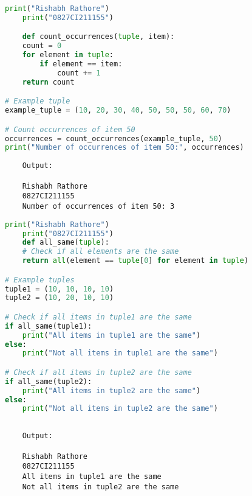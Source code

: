 \documentclass{report}
\begin{document}
\newpage

\sol 
\begin{lstlisting}[language=Python]
	print("Rishabh Rathore")
	print("0827CI211155")

	def count_occurrences(tuple, item):
    count = 0
    for element in tuple:
        if element == item:
            count += 1
    return count

# Example tuple
example_tuple = (10, 20, 30, 40, 50, 50, 50, 60, 70)

# Count occurrences of item 50
occurrences = count_occurrences(example_tuple, 50)
print("Number of occurrences of item 50:", occurrences)


\end{lstlisting}

\begin{verbatim}
	Output:

	Rishabh Rathore
	0827CI211155
	Number of occurrences of item 50: 3
\end{verbatim}



\newpage


\sol 
\begin{lstlisting}[language=Python]
	print("Rishabh Rathore")
	print("0827CI211155")
	def all_same(tuple):
    # Check if all elements are the same
    return all(element == tuple[0] for element in tuple)

# Example tuples
tuple1 = (10, 10, 10, 10)
tuple2 = (10, 20, 10, 10)

# Check if all items in tuple1 are the same
if all_same(tuple1):
    print("All items in tuple1 are the same")
else:
    print("Not all items in tuple1 are the same")

# Check if all items in tuple2 are the same
if all_same(tuple2):
    print("All items in tuple2 are the same")
else:
    print("Not all items in tuple2 are the same")
  

\end{lstlisting}

\begin{verbatim}
	Output:

	Rishabh Rathore
	0827CI211155
	All items in tuple1 are the same
	Not all items in tuple2 are the same

\end{verbatim}
\end{document}

